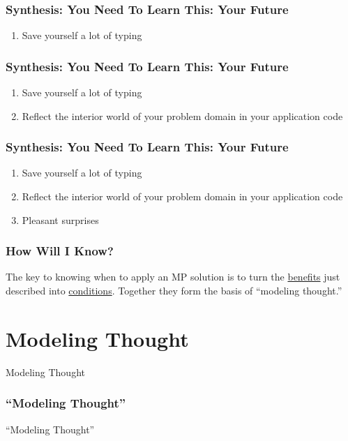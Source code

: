 \documentclass[slidestop,compress,mathserif,notes]{beamer}
\begin{document}
\begin{frame}
	\frametitle{Synthesis:  You Need To Learn This:  Your Future}
	\begin{enumerate}
		\item Save yourself a lot of typing
	\end{enumerate}
\end{frame}

\begin{frame}
	\frametitle{Synthesis:  You Need To Learn This:  Your Future}
	\begin{enumerate}
		\item Save yourself a lot of typing
		\item Reflect the interior world of your problem domain in your application code
	\end{enumerate}
\end{frame}

\begin{frame}
	\frametitle{Synthesis:  You Need To Learn This:  Your Future}
	\begin{enumerate}
		\item Save yourself a lot of typing
		\item Reflect the interior world of your problem domain in your application code
		\item Pleasant surprises
	\end{enumerate}
\end{frame}

\begin{frame}
	\frametitle{How Will I Know?}
	The key to knowing when to apply an MP solution is to turn the
\underline{benefits} just described into \underline{conditions}. Together they
form the basis of ``modeling thought.''
\end{frame}

\section{Modeling Thought} %
\label{sec:modeling_thought}

\begin{frame}
	\begin{center}
		Modeling Thought
	\end{center}
\end{frame}

\begin{frame}
	\frametitle{``Modeling Thought''}
	\large
	\vskip 0.5cm
	\begin{center}
		``Modeling Thought''
	\end{center}
	
	\normalsize
\end{frame}
\end{document}
